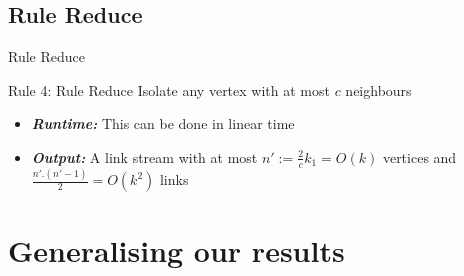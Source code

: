 \documentclass{beamer}
\begin{document}
\subsection{Rule Reduce}
\begin{frame}{Rule Reduce}
  \begin{block}{Rule 4: Rule Reduce}
    Isolate any vertex with at most $c$ neighbours
  \end{block}
  \begin{block}{}
    \begin{itemize}
    \item \emph{\bfseries Runtime:} This can be done in linear time
    \item \emph{\bfseries Output:} A link stream with at most $n':=\frac{2}{c}k_1=O(k)$ vertices and $\frac{n'.(n'-1)}{2}=O(k^2)$ links
    \end{itemize}
  \end{block}
\end{frame}

\section{Generalising our results}
\end{document}
